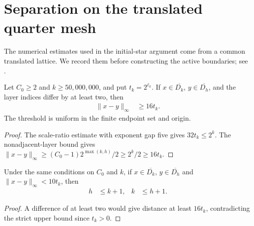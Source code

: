 \section{Separation on the translated quarter mesh}
\label{sec:area_law_quarter_mesh}

The numerical estimates used in the initial-star argument come from a
common translated lattice. We record them before constructing
the active boundaries; see \cite[Section~11]{OpenAI2026AreaLaw}.


\begin{lemma}
    \label{thm:area_law_local_layer_exclusion}
    \leanok
    Let $C_0\ge2$ and $k\ge50{,}000{,}000$, and put $t_k=2^{\ell_k}$.
    If $x\in\overline{D_k}$, $y\in\overline{D_h}$, and the layer
    indices differ by at least two, then
    \begin{align}
        \|x-y\|_\infty & \ge16t_k.
    \end{align}
    The threshold is uniform in the finite endpoint set and origin.
\end{lemma}
\begin{proof}\leanok
    The scale-ratio estimate with exponent gap five gives $32t_k\le2^k$.
    The nonadjacent-layer bound gives
    $\|x-y\|_\infty\ge(C_0-1)2^{\max(k,h)}/2\ge2^k/2\ge16t_k$.
\end{proof}

\begin{lemma}
    \label{thm:area_law_local_layer_indices}
    \leanok
    Under the same conditions on $C_0$ and $k$, if
    $x\in\overline{D_k}$, $y\in\overline{D_h}$ and
    $\|x-y\|_\infty<10t_k$, then
    \begin{align}
        h & \le k+1, & k & \le h+1.
    \end{align}
\end{lemma}
\begin{proof}\leanok
    A difference of at least two would give distance at least $16t_k$,
    contradicting the strict upper bound since $t_k>0$.
\end{proof}


